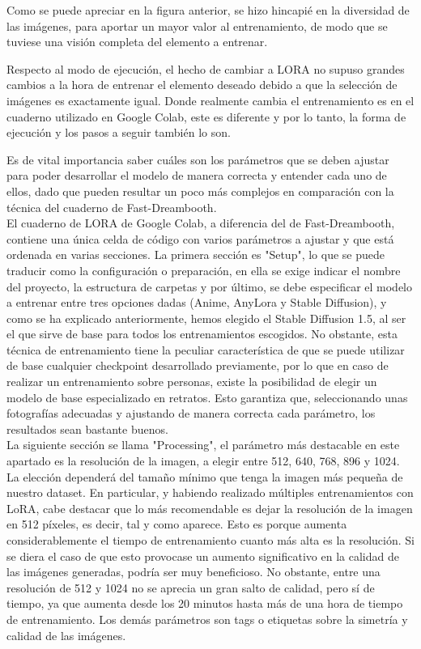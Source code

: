 Como se puede apreciar en la figura anterior, se hizo hincapié en la diversidad de las imágenes, para aportar un mayor valor al entrenamiento, de modo que se tuviese una visión completa del elemento a entrenar.

Respecto al modo de ejecución, el hecho de cambiar a LORA no supuso grandes cambios a la hora de entrenar el elemento deseado debido a que la selección de imágenes es exactamente igual. Donde realmente cambia el entrenamiento es en el cuaderno utilizado en Google Colab, este es diferente y por lo tanto, la forma de ejecución y los pasos a seguir también lo son. 

Es de vital importancia saber cuáles son los parámetros que se deben ajustar para poder desarrollar el modelo de manera correcta y entender cada uno de ellos, dado que pueden resultar un poco más complejos en comparación con la técnica del cuaderno de Fast-Dreambooth.\\

El cuaderno de LORA de Google Colab, a diferencia del de Fast-Dreambooth, contiene una única celda de código con varios parámetros a ajustar y que  está ordenada en varias secciones. La primera sección es "Setup", lo que se puede traducir como la configuración o preparación, en ella se exige indicar el nombre del proyecto, la estructura de carpetas y por último, se debe especificar el modelo a entrenar entre tres opciones dadas (Anime, AnyLora y Stable Diffusion), y como se ha explicado anteriormente, hemos elegido el Stable Diffusion 1.5, al ser el que sirve de base para todos los entrenamientos escogidos. No obstante, esta técnica de entrenamiento tiene la peculiar característica de que se puede utilizar de base cualquier checkpoint desarrollado previamente, por lo que en caso de realizar un entrenamiento sobre personas, existe la posibilidad de elegir un modelo de base especializado en retratos. Esto garantiza que, seleccionando unas fotografías adecuadas y ajustando de manera correcta cada parámetro, los resultados sean bastante buenos.\\

La siguiente sección se llama "Processing", el parámetro más destacable en este apartado es la resolución de la imagen, a elegir entre 512, 640, 768, 896 y 1024. La elección dependerá del tamaño mínimo que tenga la imagen más pequeña de nuestro dataset.  En particular, y habiendo realizado múltiples entrenamientos con LoRA, cabe destacar que lo más recomendable es dejar la resolución de la imagen en 512 píxeles, es decir, tal y como aparece. Esto es porque aumenta considerablemente el tiempo de entrenamiento cuanto más alta es la resolución. Si se diera el caso de que esto provocase un aumento significativo en la calidad de las imágenes generadas, podría ser muy beneficioso. No obstante, entre una resolución de 512 y 1024 no se aprecia un gran salto de calidad, pero sí de tiempo, ya que aumenta desde los 20 minutos hasta más de una hora de tiempo de entrenamiento. Los demás parámetros son tags o etiquetas sobre la simetría y calidad de las imágenes. \\

